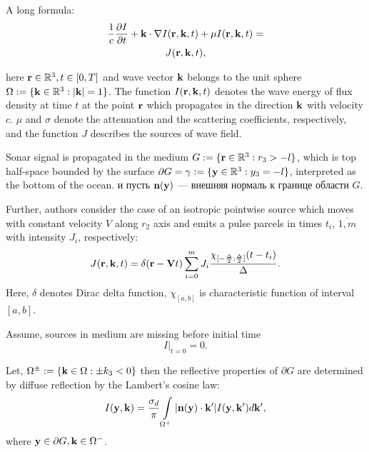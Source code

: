 \documentclass{procDDs}
\begin{document}
A long formula:
\begin{multline}
	\label{model}
	\frac{1}{c} \frac{\partial I}{\partial t} + \mathbf{k} \cdot \nabla I(\mathbf{r},\mathbf{k},t) + 
	\mu I(\mathbf{r},\mathbf{k},t) = \\ J(\mathbf{r},\mathbf{k},t),
\end{multline}

here $\mathbf{r} \in \mathbb{R}^3, t \in [0, T]$ and wave vector $\mathbf{k}$ belongs to the unit sphere $\Omega := \{\mathbf{k} \in \mathbb{R}^3: |\mathbf{k}| = 1\}$. The function $I(\mathbf{r},\mathbf{k}, t)$ denotes the wave energy of flux density at time $t$  at the point $\mathbf{r}$ which propagates in the direction $\mathbf{k}$  with velocity $c$. $\mu$ and $\sigma$ denote the attenuation and the scattering coefficients, respectively, and the function $J$ describes the sources of
wave field.

Sonar signal is propagated in the medium $G:=\{\mathbf{r} \in \mathbb{R}^3:r_3 > -l\}$, which is top half-space bounded by the surface $\partial G = \gamma := \{\mathbf{y} \in \mathbb{R}^3: y_3 = -l \}$, interpreted as the bottom of the ocean. и пусть $\textbf{n}(\mathbf{y})$ --- внешняя нормаль к  границе области $G$. 



Further, authors consider the case of an isotropic pointwise source which moves with constant velocity $V$ along $r_2$ axis and emits a pulse parcels in times $t_i$, $\overline{1,m}$ with intensity $J_i$, respectively: 
\begin{equation}
	\label{source}
	J(\mathbf{r},\mathbf{k}, t) = \delta(\mathbf{r} - \mathbf{V} t)\sum\limits_{i=0}^{m} J_i \frac{ \chi_{[-\frac{\Delta}{2};\frac{\Delta}{2}]}(t-t_i)}{\Delta}.
\end{equation}
Here, $\delta$ denotes Dirac delta function, $\chi_{[a,b]}$ is characteristic function of interval $[a,b]$.

Assume, sources in medium are missing before initial time
\begin{equation}
	\label{init_cond}
	I\rvert_{t=0}=0.
\end{equation}

Let, $\Omega^\pm := \{\mathbf{k} \in \Omega: \pm k_3 < 0\}$ then the reflective properties of $\partial G$  are determined by diffuse reflection by the Lambert’s cosine law:
\begin{equation}
	\label{boundary_condition}
	I(\mathbf{y},\mathbf{k}) = \frac{\sigma_d}{\pi} \int\limits_{\Omega ^+}|\mathbf{n}(\mathbf{y})\cdot \mathbf{k}'| I(\mathbf{y},\mathbf{k}') d\mathbf{k}' ,
\end{equation}
where  $\mathbf{y} \in \partial G, \mathbf{k} \in \Omega^-$.
\end{document}
